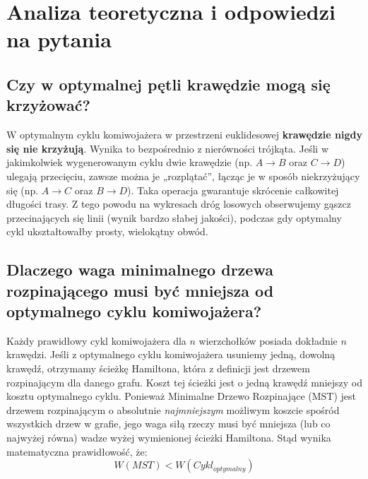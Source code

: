 \documentclass[12pt,a4paper]{article}
\begin{document}
\section{Analiza teoretyczna i odpowiedzi na pytania}

\subsection{Czy w optymalnej pętli krawędzie mogą się krzyżować?}
W optymalnym cyklu komiwojażera w przestrzeni euklidesowej \textbf{krawędzie nigdy się nie krzyżują}. Wynika to bezpośrednio z nierówności trójkąta. Jeśli w jakimkolwiek wygenerowanym cyklu dwie krawędzie (np. $A \rightarrow B$ oraz $C \rightarrow D$) ulegają przecięciu, zawsze można je „rozplątać”, łącząc je w sposób niekrzyżujący się (np. $A \rightarrow C$ oraz $B \rightarrow D$). Taka operacja gwarantuje skrócenie całkowitej długości trasy. Z tego powodu na wykresach dróg losowych obserwujemy gąszcz przecinających się linii (wynik bardzo słabej jakości), podczas gdy optymalny cykl ukształtowałby prosty, wielokątny obwód.

\subsection{Dlaczego waga minimalnego drzewa rozpinającego musi być mniejsza od optymalnego cyklu komiwojażera?}
Każdy prawidłowy cykl komiwojażera dla $n$ wierzchołków posiada dokładnie $n$ krawędzi. Jeśli z optymalnego cyklu komiwojażera usuniemy jedną, dowolną krawędź, otrzymamy ścieżkę Hamiltona, która z definicji jest drzewem rozpinającym dla danego grafu. Koszt tej ścieżki jest o jedną krawędź mniejszy od kosztu optymalnego cyklu. Ponieważ Minimalne Drzewo Rozpinające (MST) jest drzewem rozpinającym o absolutnie \textit{najmniejszym} możliwym koszcie spośród wszystkich drzew w grafie, jego waga siłą rzeczy musi być mniejsza (lub co najwyżej równa) wadze wyżej wymienionej ścieżki Hamiltona. Stąd wynika matematyczna prawidłowość, że:
$$W(MST) < W(Cykl_{optymalny})$$
\end{document}
